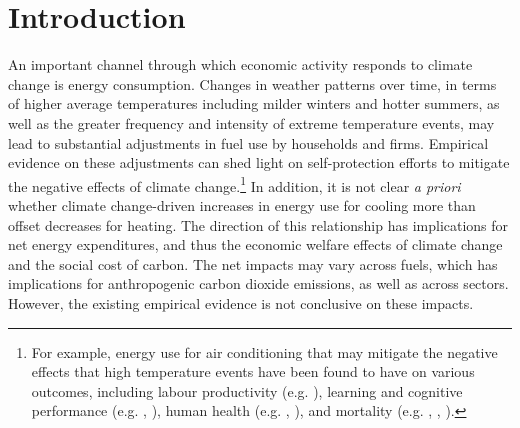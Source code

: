 \documentclass[11pt]{article}
\begin{document}

\section{Introduction}

An important channel through which economic activity responds to climate change is energy consumption. Changes in weather patterns over time, in terms of higher average temperatures including milder winters and hotter summers, as well as the greater frequency and intensity of extreme temperature events, may lead to substantial adjustments in fuel use by households and firms. Empirical evidence on these adjustments can shed light on self-protection efforts to mitigate the negative effects of climate change.\footnote{ For example, energy use for air conditioning that may mitigate the negative effects that high temperature events have been found to have on various outcomes, including labour productivity (e.g. \cite{ZHANG20181}), learning and cognitive performance (e.g. \cite{graff2018temperature}, \cite{park2020}), human health (e.g. \cite{DGJ1}, \cite{white2017dynamic}), and mortality (e.g. \cite{cohen2019mortality}, \cite{heutel2021adaptation}, \cite{Carleton22}).} In addition, it is not clear \textit{a priori} whether climate change-driven increases in energy use for cooling more than offset decreases for heating. The direction of this relationship has implications for net energy expenditures, and thus the economic welfare effects of climate change and the social cost of carbon. The net impacts may vary across fuels, which has implications for anthropogenic carbon dioxide emissions, as well as across sectors. However, the existing empirical evidence is not conclusive on these impacts.
\end{document}
